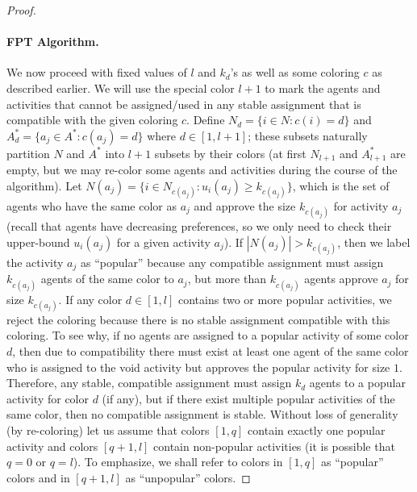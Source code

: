 \begin{proof}
\paragraph{FPT Algorithm.}
We now proceed with fixed values of $l$ and $k_d$'s as well as some coloring $c$ as described earlier. 
We will use the special color $l+1$ to mark the agents and activities that cannot be assigned/used in any stable assignment that is compatible with the given coloring $c$. 
Define $N_d = \{i\in N: c(i) = d\}$ and $A^*_d = \{a_j \in A^* : c(a_j) = d\}$ where $d\in [1, l+1]$; these subsets naturally partition $N$ and $A^*$ into $l+1$ subsets by their colors (at first $N_{l+1}$ and $A^*_{l+1}$ are empty, but we may re-color some agents and activities during the course of the algorithm).
Let $N(a_j) = \{i \in N_{c(a_j)} : u_i(a_j) \geq k_{c(a_j)}\}$, which is the set of agents who have the same color as $a_j$ and approve the size $k_{c(a_j)}$ for activity $a_j$ (recall that agents have decreasing preferences, so we only need to check their upper-bound $u_i(a_j)$ for a given activity $a_j$).
If $|N(a_j)| > k_{c(a_j)}$, then we label the activity $a_j$ as ``popular'' because any compatible assignment must assign $k_{c(a_j)}$ agents of the same color to $a_j$, but more than $k_{c(a_j)}$ agents approve $a_j$ for size $k_{c(a_j)}$.
If any color $d\in [1, l]$ contains two or more popular activities, we reject the coloring because there is no stable assignment compatible with this coloring. To see why, if no agents are assigned to a popular activity of some color $d$, then due to compatibility there must exist at least one agent of the same color who is assigned to the void activity but approves the popular activity for size $1$. Therefore, any stable, compatible assignment must assign $k_d$ agents to a popular activity for color $d$ (if any), but if there exist multiple popular activities of the same color, then no compatible assignment is stable. 
Without loss of generality (by re-coloring) let us assume that colors $[1,q]$ contain exactly one popular activity and colors $[q+1, l]$ contain non-popular activities (it is possible that $q = 0$ or $q = l$). To emphasize, we shall refer to colors in $[1, q]$ as ``popular'' colors and in $[q+1, l]$ as ``unpopular'' colors. 


\end{proof}

